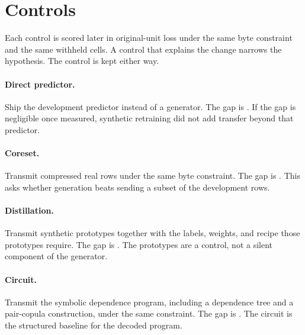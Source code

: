 \section{Controls}
Each control is scored later in original-unit loss under the same byte constraint and the same withheld cells.
A control that explains the change narrows the hypothesis.
The control is kept either way.

\paragraph{Direct predictor.}
Ship the development predictor instead of a generator.
The gap is .
If the gap is negligible once measured, synthetic retraining did not add transfer beyond that predictor.

\paragraph{Coreset.}
Transmit compressed real rows under the same byte constraint.
The gap is .
This asks whether generation beats sending a subset of the development rows.

\paragraph{Distillation.}
Transmit synthetic prototypes together with the labels, weights, and recipe those prototypes require.
The gap is .
The prototypes are a control, not a silent component of the generator.

\paragraph{Circuit.}
Transmit the symbolic dependence program, including a dependence tree and a pair-copula construction, under the same constraint.
The gap is .
The circuit is the structured baseline for the decoded program.
